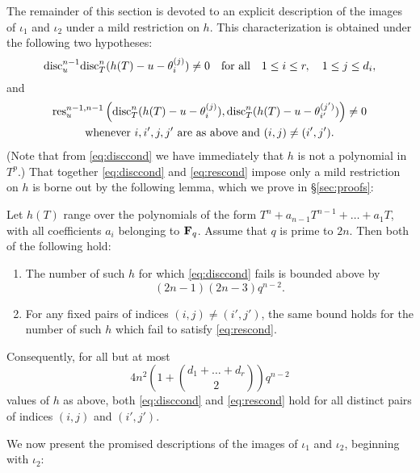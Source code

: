 \documentclass[a4paper]{compositio}
\begin{document}
The remainder of this section is devoted to an explicit description
of the images of $\iota_1$ and $\iota_2$ under a mild restriction on
$h$. This characterization is obtained under the following two
hypotheses:
\begin{equation}\label{eq:disccond}
 \mathrm{disc}_u^{n-1}\mathrm{disc}_{T}^n (h(T)-u - \theta_i^{(j)}) \neq 0 \quad \text{for all}\quad 1 \leq i \leq r, \quad 1 \leq j\leq
 d_i,
\end{equation}
and
\begin{multline}\label{eq:rescond}
 \mathrm{res}_{u}^{n-1,n-1}\left(\mathrm{disc}_{T}^n (h(T)-u -
\theta_i^{(j)}),\mathrm{disc}_{T}^n (h(T)-u - \theta_{i'}^{(j')})\right) \neq 0 \\
\text{whenever $i, i', j, j'$ are as above and $(i,j) \neq (i',
j')$.}
\end{multline}
(Note that from \eqref{eq:disccond} we have immediately that $h$ is
not a polynomial in $T^p$.) That together \eqref{eq:disccond} and
\eqref{eq:rescond} impose only a mild restriction on $h$ is borne
out by the following lemma, which we prove in \S\ref{sec:proofs}:

\begin{lem}\label{lem:few} Let $h(T)$ range over the polynomials of the
form $T^n + a_{n-1} T^{n-1} + \dots + a_1 T$, with all coefficients
$a_i$ belonging to $\mathbf{F}_q$. Assume that $q$ is prime to $2n$. Then
both of the following hold:
\begin{enumerate}\item The number of such $h$ for which
\eqref{eq:disccond} fails is bounded above by
\begin{equation}\label{eq:bounds}
 (2n-1)(2n-3) q^{n-2}. \end{equation}
 \item For any fixed pairs of indices $(i,j) \neq (i',j')$, the same bound holds for the
number of such $h$ which fail to satisfy \eqref{eq:rescond}.
\end{enumerate}
Consequently, for all but at most
\[ 4n^2\left(1 + \binom{d_1 + \dots + d_r}{2}\right) q^{n-2} \]
values of $h$ as above, both \eqref{eq:disccond} and
\eqref{eq:rescond} hold for all distinct pairs of indices $(i, j)$
and $(i', j')$.
\end{lem}

We now present the promised descriptions of the images of $\iota_1$
and $\iota_2$, beginning with $\iota_2$:
\end{document}
